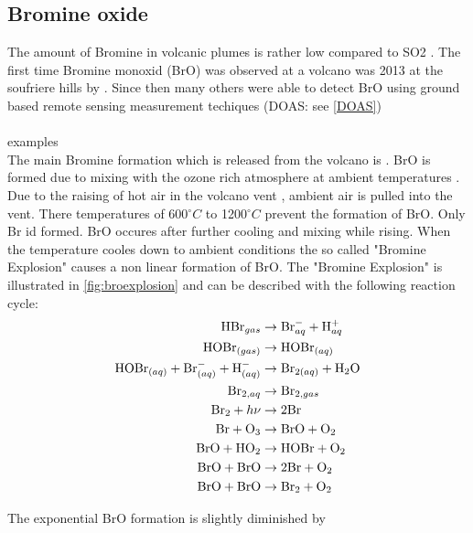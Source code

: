 \documentclass  [
  paper    = a4,
  BCOR     = 10mm,
  twoside,
  fontsize = 12pt,
  fleqn,
  toc      = bibnumbered,
  toc      = listofnumbered,
  numbers  = noendperiod,
  headings = normal,
  listof   = leveldown,
  version  = 3.03
]                                       {scrreprt}
\begin{document}
	\subsection{Bromine oxide}
	The amount of Bromine in volcanic plumes is rather low compared to SO2 \cite{Bobrowski 2013}. The first time Bromine monoxid (BrO) was observed at a volcano was 2013 at the soufriere hills by \cite{Bobrowski 2013}. Since then many others were able to detect BrO using ground based remote sensing measurement techiques (DOAS: see \cref{DOAS})\\
	\\
	examples
	\\
	The main Bromine formation which is released from the volcano is  . BrO is formed due to mixing with the ozone rich atmosphere at ambient temperatures \cite{bobrowski2007reactive}.\\
	Due to the raising of hot air in the volcano vent , ambient air is pulled into the vent. There temperatures of  600$^{\circ}C$ to 1200$^{\circ}C$	prevent the formation of BrO. Only Br id formed. BrO occures after further cooling and mixing while rising. When the temperature cooles down to ambient conditions the so called "Bromine Explosion" causes a non linear formation of BrO.
	The "Bromine Explosion" is illustrated in \cref{fig:broexplosion} and can be described with the following reaction cycle:
	\begin{align}
		\ce{HBr}_{gas} &\rightarrow \ce{Br}^{-}_{aq} + \ce{H}^{+}_{aq}\\
		\ce{HOBr}_{(gas)} &\rightarrow \ce{HOBr}_{(aq)} \\
		\ce{HOBr}_{(aq)} + \ce{Br}^{-}_{(aq)} + \ce{H}^{-}_{(aq)} &\rightarrow
	    \ce{Br}_{2(aq)} +  \ce{H2O}\\
		\ce{Br}_{2,aq} &\rightarrow \ce{Br}_{2,gas} \\
		\ce{Br2} + h\nu &\rightarrow 2 \ce{Br} \\
		\ce{Br} + \ce{O3} &\rightarrow \ce{BrO} + \ce{O2} \\
		\ce{BrO} + \ce{HO2} &\rightarrow \ce{HOBr} + \ce{O2} \\
		\ce{BrO} + \ce{BrO} &\rightarrow 2 \ce{Br} + \ce{O2} \\
		\ce{BrO} + \ce{BrO} &\rightarrow \ce{Br2} + \ce{O2} 
	\end{align}
	
	The exponential BrO formation is slightly diminished by 
	
	
	
	
	
\end{document}
